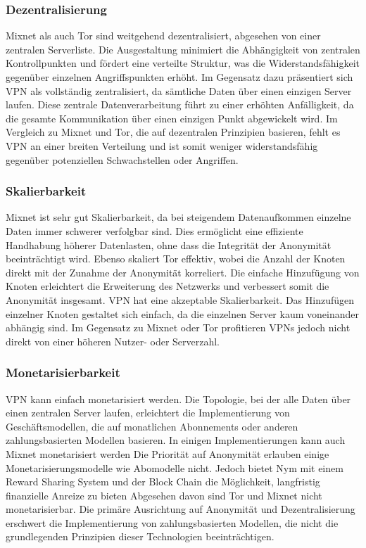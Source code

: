 \subsubsection{Dezentralisierung}

Mixnet als auch Tor sind weitgehend dezentralisiert, abgesehen von einer zentralen Serverliste. Die Ausgestaltung minimiert die Abhängigkeit von zentralen Kontrollpunkten und fördert eine verteilte Struktur, was die Widerstandsfähigkeit gegenüber einzelnen Angriffspunkten erhöht.
Im Gegensatz dazu präsentiert sich VPN als vollständig zentralisiert, da sämtliche Daten über einen einzigen Server laufen. Diese zentrale Datenverarbeitung führt zu einer erhöhten Anfälligkeit, da die gesamte Kommunikation über einen einzigen Punkt abgewickelt wird. Im Vergleich zu Mixnet und Tor, die auf dezentralen Prinzipien basieren, fehlt es VPN an einer breiten Verteilung und ist somit weniger widerstandsfähig gegenüber potenziellen Schwachstellen oder Angriffen.

\subsubsection{Skalierbarkeit}

Mixnet ist sehr gut Skalierbarkeit, da bei steigendem Datenaufkommen einzelne Daten immer schwerer verfolgbar sind. Dies ermöglicht eine effiziente Handhabung höherer Datenlasten, ohne dass die Integrität der Anonymität beeinträchtigt wird.
Ebenso skaliert Tor effektiv, wobei die Anzahl der Knoten direkt mit der Zunahme der Anonymität korreliert. Die einfache Hinzufügung von Knoten erleichtert die Erweiterung des Netzwerks und verbessert somit die Anonymität insgesamt.
VPN hat eine akzeptable Skalierbarkeit. Das Hinzufügen einzelner Knoten gestaltet sich einfach, da die einzelnen Server kaum voneinander abhängig sind. Im Gegensatz zu Mixnet oder Tor profitieren VPNs jedoch nicht direkt von einer höheren Nutzer- oder Serverzahl.

\subsubsection{Monetarisierbarkeit}

VPN kann einfach monetarisiert werden. Die Topologie, bei der alle Daten über einen zentralen Server laufen, erleichtert die Implementierung von Geschäftsmodellen, die auf monatlichen Abonnements oder anderen zahlungsbasierten Modellen basieren.
In einigen Implementierungen kann auch Mixnet monetarisiert werden Die Priorität auf Anonymität erlauben einige Monetarisierungsmodelle wie Abomodelle nicht. Jedoch bietet Nym mit einem Reward Sharing System und der Block Chain die Möglichkeit, langfristig finanzielle Anreize zu bieten
Abgesehen davon sind Tor und Mixnet nicht monetarisierbar. Die primäre Ausrichtung auf Anonymität und Dezentralisierung erschwert die Implementierung von zahlungsbasierten Modellen, die nicht die grundlegenden Prinzipien dieser Technologien beeinträchtigen.

